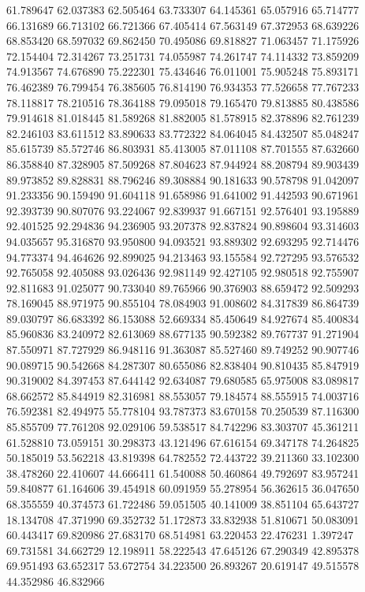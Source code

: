 61.789647
62.037383
62.505464
63.733307
64.145361
65.057916
65.714777
66.131689
66.713102
66.721366
67.405414
67.563149
67.372953
68.639226
68.853420
68.597032
69.862450
70.495086
69.818827
71.063457
71.175926
72.154404
72.314267
73.251731
74.055987
74.261747
74.114332
73.859209
74.913567
74.676890
75.222301
75.434646
76.011001
75.905248
75.893171
76.462389
76.799454
76.385605
76.814190
76.934353
77.526658
77.767233
78.118817
78.210516
78.364188
79.095018
79.165470
79.813885
80.438586
79.914618
81.018445
81.589268
81.882005
81.578915
82.378896
82.761239
82.246103
83.611512
83.890633
83.772322
84.064045
84.432507
85.048247
85.615739
85.572746
86.803931
85.413005
87.011108
87.701555
87.632660
86.358840
87.328905
87.509268
87.804623
87.944924
88.208794
89.903439
89.973852
89.828831
88.796246
89.308884
90.181633
90.578798
91.042097
91.233356
90.159490
91.604118
91.658986
91.641002
91.442593
90.671961
92.393739
90.807076
93.224067
92.839937
91.667151
92.576401
93.195889
92.401525
92.294836
94.236905
93.207378
92.837824
90.898604
93.314603
94.035657
95.316870
93.950800
94.093521
93.889302
92.693295
92.714476
94.773374
94.464626
92.899025
94.213463
93.155584
92.727295
93.576532
92.765058
92.405088
93.026436
92.981149
92.427105
92.980518
92.755907
92.811683
91.025077
90.733040
89.765966
90.376903
88.659472
92.509293
78.169045
88.971975
90.855104
78.084903
91.008602
84.317839
86.864739
89.030797
86.683392
86.153088
52.669334
85.450649
84.927674
85.400834
85.960836
83.240972
82.613069
88.677135
90.592382
89.767737
91.271904
87.550971
87.727929
86.948116
91.363087
85.527460
89.749252
90.907746
90.089715
90.542668
84.287307
80.655086
82.838404
90.810435
85.847919
90.319002
84.397453
87.644142
92.634087
79.680585
65.975008
83.089817
68.662572
85.844919
82.316981
88.553057
79.184574
88.555915
74.003716
76.592381
82.494975
55.778104
93.787373
83.670158
70.250539
87.116300
85.855709
77.761208
92.029106
59.538517
84.742296
83.303707
45.361211
61.528810
73.059151
30.298373
43.121496
67.616154
69.347178
74.264825
50.185019
53.562218
43.819398
64.782552
72.443722
39.211360
33.102300
38.478260
22.410607
44.666411
61.540088
50.460864
49.792697
83.957241
59.840877
61.164606
39.454918
60.091959
55.278954
56.362615
36.047650
68.355559
40.374573
61.722486
59.051505
40.141009
38.851104
65.643727
18.134708
47.371990
69.352732
51.172873
33.832938
51.810671
50.083091
60.443417
69.820986
27.683170
68.514981
63.220453
22.476231
1.397247
69.731581
34.662729
12.198911
58.222543
47.645126
67.290349
42.895378
69.951493
63.652317
53.672754
34.223500
26.893267
20.619147
49.515578
44.352986
46.832966
